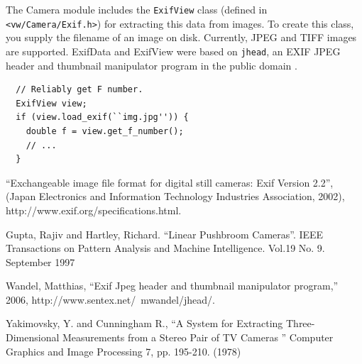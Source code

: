 The Camera module includes the {\tt ExifView} class (defined in
\verb#<vw/Camera/Exif.h>#) for extracting this data from images.  To
create this class, you supply the filename of an image on disk.
Currently, JPEG and TIFF images are supported.  ExifData and ExifView
were based on {\tt jhead}, an EXIF JPEG header and thumbnail manipulator
program in the public domain \cite{jhead}.

\begin{verbatim}
  // Reliably get F number. 
  ExifView view;
  if (view.load_exif(``img.jpg'')) {
    double f = view.get_f_number();
    // ...
  }
\end{verbatim}

\begin{thebibliography}{1}

 ``Exchangeable image file format for digital still cameras: Exif Version 2.2'',
(Japan Electronics and Information Technology Industries Association, 2002),
http://www.exif.org/specifications.html.

 Gupta, Rajiv and Hartley, Richard. ``Linear Pushbroom Cameras''.  IEEE
 Transactions on Pattern Analysis and Machine Intelligence. Vol.19 No. 9. September 1997

 Wandel, Matthias, ``Exif Jpeg header and thumbnail manipulator program,'' 2006,
http://www.sentex.net/~mwandel/jhead/.

  Yakimovsky, Y. and Cunningham R., ``A System for Extracting
  Three-Dimensional Measurements from a Stereo Pair of TV Cameras ''
  Computer Graphics and Image Processing 7, pp. 195-210. (1978)

\end{thebibliography}
